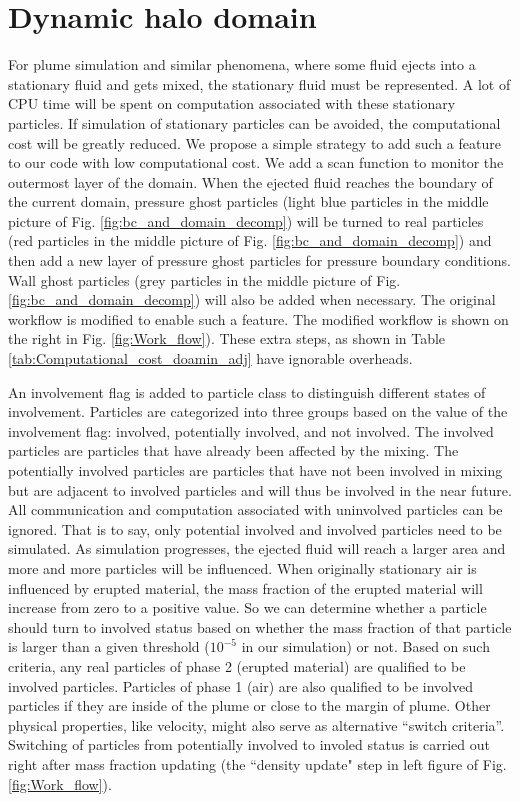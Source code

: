 \section{Dynamic halo domain} 
For plume simulation and similar phenomena, where some fluid ejects into a stationary fluid and gets mixed, the stationary fluid must be represented.
A lot of CPU time will be spent on computation associated with these stationary particles. If simulation of stationary particles can be avoided, the computational cost will be greatly reduced.
We propose a simple strategy to add such a feature to our code with low computational cost. We add a scan function to monitor the outermost layer of the domain. When the ejected fluid reaches the boundary of the current domain, pressure ghost particles (light blue particles in the middle picture of Fig. \ref{fig:bc_and_domain_decomp}) will be turned to real particles (red particles in the middle picture of Fig. \ref{fig:bc_and_domain_decomp}) and then add a new layer of pressure ghost particles for pressure boundary conditions. Wall ghost particles (grey particles in the middle picture of Fig. \ref{fig:bc_and_domain_decomp}) will also be added when necessary. The original workflow is modified to enable such a feature. The modified workflow is shown on the right in Fig. \ref{fig:Work_flow}). These extra steps, as shown in Table \ref{tab:Computational_cost_doamin_adj} have ignorable overheads.

An involvement flag is added to particle class to distinguish different states of involvement. Particles are categorized into three groups based on the value of the involvement flag: involved, potentially involved, and not involved. The involved particles are particles that have already been affected by the mixing. The potentially involved particles are particles that have not been involved in mixing but are adjacent to involved particles and will thus be involved in the near future. 
All communication and computation associated with uninvolved particles can be ignored. That is to say, only potential involved and involved particles need to be simulated.
As simulation progresses, the ejected fluid will reach a larger area and more and more particles will be influenced. When originally stationary air is influenced by erupted material, the mass fraction of the erupted material will increase from zero to a positive value. So we can determine whether a particle should turn to involved status based on whether the mass fraction of that particle is larger than a given threshold ($10^{-5} $ in our simulation) or not. Based on such criteria, any real particles of phase 2 (erupted material) are qualified to be involved particles.  Particles of phase 1 (air) are also qualified to be involved particles if they are inside of the plume or close to the margin of plume. Other physical properties, like velocity, might also serve as alternative ``switch criteria''. Switching of particles from potentially involved to involed status is carried out right after mass fraction updating (the ``density update" step in left figure of Fig. \ref{fig:Work_flow}).

